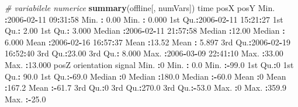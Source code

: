 \documentclass[]{article}
\newenvironment{Shaded}{\begin{snugshade}}{\end{snugshade}}
\newcommand{\KeywordTok}[1]{\textcolor[rgb]{0.13,0.29,0.53}{\textbf{#1}}}
\newcommand{\DecValTok}[1]{\textcolor[rgb]{0.00,0.00,0.81}{#1}}
\newcommand{\FloatTok}[1]{\textcolor[rgb]{0.00,0.00,0.81}{#1}}
\newcommand{\StringTok}[1]{\textcolor[rgb]{0.31,0.60,0.02}{#1}}
\newcommand{\CommentTok}[1]{\textcolor[rgb]{0.56,0.35,0.01}{\textit{#1}}}
\newcommand{\OperatorTok}[1]{\textcolor[rgb]{0.81,0.36,0.00}{\textbf{#1}}}
\newcommand{\NormalTok}[1]{#1}
\begin{document}
\begin{Shaded}
\begin{Highlighting}[]
\CommentTok{# variabilele numerice}
\KeywordTok{summary}\NormalTok{(offline[, numVars])}
\NormalTok{      time                          posX            posY       }
\NormalTok{ Min.   }\OperatorTok{:}\DecValTok{2006}\OperatorTok{-}\DecValTok{02}\OperatorTok{-}\DecValTok{11} \DecValTok{09}\OperatorTok{:}\DecValTok{31}\OperatorTok{:}\DecValTok{58}\NormalTok{   Min.   }\OperatorTok{:}\StringTok{ }\FloatTok{0.00}\NormalTok{   Min.   }\OperatorTok{:}\StringTok{ }\FloatTok{0.000}  
\NormalTok{ 1st Qu.}\OperatorTok{:}\DecValTok{2006}\OperatorTok{-}\DecValTok{02}\OperatorTok{-}\DecValTok{11} \DecValTok{15}\OperatorTok{:}\DecValTok{21}\OperatorTok{:}\DecValTok{27}\NormalTok{   1st Qu.}\OperatorTok{:}\StringTok{ }\FloatTok{2.00}\NormalTok{   1st Qu.}\OperatorTok{:}\StringTok{ }\FloatTok{3.000}  
\NormalTok{ Median }\OperatorTok{:}\DecValTok{2006}\OperatorTok{-}\DecValTok{02}\OperatorTok{-}\DecValTok{11} \DecValTok{21}\OperatorTok{:}\DecValTok{57}\OperatorTok{:}\DecValTok{58}\NormalTok{   Median }\OperatorTok{:}\FloatTok{12.00}\NormalTok{   Median }\OperatorTok{:}\StringTok{ }\FloatTok{6.000}  
\NormalTok{ Mean   }\OperatorTok{:}\DecValTok{2006}\OperatorTok{-}\DecValTok{02}\OperatorTok{-}\DecValTok{16} \DecValTok{16}\OperatorTok{:}\DecValTok{57}\OperatorTok{:}\DecValTok{37}\NormalTok{   Mean   }\OperatorTok{:}\FloatTok{13.52}\NormalTok{   Mean   }\OperatorTok{:}\StringTok{ }\FloatTok{5.897}  
\NormalTok{ 3rd Qu.}\OperatorTok{:}\DecValTok{2006}\OperatorTok{-}\DecValTok{02}\OperatorTok{-}\DecValTok{19} \DecValTok{16}\OperatorTok{:}\DecValTok{52}\OperatorTok{:}\DecValTok{40}\NormalTok{   3rd Qu.}\OperatorTok{:}\FloatTok{23.00}\NormalTok{   3rd Qu.}\OperatorTok{:}\StringTok{ }\FloatTok{8.000}  
\NormalTok{ Max.   }\OperatorTok{:}\DecValTok{2006}\OperatorTok{-}\DecValTok{03}\OperatorTok{-}\DecValTok{09} \DecValTok{22}\OperatorTok{:}\DecValTok{41}\OperatorTok{:}\DecValTok{10}\NormalTok{   Max.   }\OperatorTok{:}\FloatTok{33.00}\NormalTok{   Max.   }\OperatorTok{:}\FloatTok{13.000}  
\NormalTok{      posZ    orientation        signal     }
\NormalTok{ Min.   }\OperatorTok{:}\DecValTok{0}\NormalTok{   Min.   }\OperatorTok{:}\StringTok{  }\FloatTok{0.0}\NormalTok{   Min.   }\OperatorTok{:-}\FloatTok{99.0}  
\NormalTok{ 1st Qu.}\OperatorTok{:}\DecValTok{0}\NormalTok{   1st Qu.}\OperatorTok{:}\StringTok{ }\FloatTok{90.0}\NormalTok{   1st Qu.}\OperatorTok{:-}\FloatTok{69.0}  
\NormalTok{ Median }\OperatorTok{:}\DecValTok{0}\NormalTok{   Median }\OperatorTok{:}\FloatTok{180.0}\NormalTok{   Median }\OperatorTok{:-}\FloatTok{60.0}  
\NormalTok{ Mean   }\OperatorTok{:}\DecValTok{0}\NormalTok{   Mean   }\OperatorTok{:}\FloatTok{167.2}\NormalTok{   Mean   }\OperatorTok{:-}\FloatTok{61.7}  
\NormalTok{ 3rd Qu.}\OperatorTok{:}\DecValTok{0}\NormalTok{   3rd Qu.}\OperatorTok{:}\FloatTok{270.0}\NormalTok{   3rd Qu.}\OperatorTok{:-}\FloatTok{53.0}  
\NormalTok{ Max.   }\OperatorTok{:}\DecValTok{0}\NormalTok{   Max.   }\OperatorTok{:}\FloatTok{359.9}\NormalTok{   Max.   }\OperatorTok{:-}\FloatTok{25.0}  


\end{Highlighting}
\end{Shaded}
\end{document}
